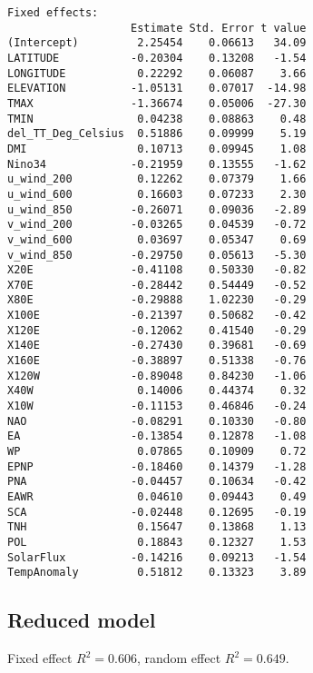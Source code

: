 \documentclass[fleqn,11pt]{article}
\begin{document}
\begin{scriptsize}
\begin{verbatim}
Fixed effects:
                   Estimate Std. Error t value
(Intercept)         2.25454    0.06613   34.09
LATITUDE           -0.20304    0.13208   -1.54
LONGITUDE           0.22292    0.06087    3.66
ELEVATION          -1.05131    0.07017  -14.98
TMAX               -1.36674    0.05006  -27.30
TMIN                0.04238    0.08863    0.48
del_TT_Deg_Celsius  0.51886    0.09999    5.19
DMI                 0.10713    0.09945    1.08
Nino34             -0.21959    0.13555   -1.62
u_wind_200          0.12262    0.07379    1.66
u_wind_600          0.16603    0.07233    2.30
u_wind_850         -0.26071    0.09036   -2.89
v_wind_200         -0.03265    0.04539   -0.72
v_wind_600          0.03697    0.05347    0.69
v_wind_850         -0.29750    0.05613   -5.30
X20E               -0.41108    0.50330   -0.82
X70E               -0.28442    0.54449   -0.52
X80E               -0.29888    1.02230   -0.29
X100E              -0.21397    0.50682   -0.42
X120E              -0.12062    0.41540   -0.29
X140E              -0.27430    0.39681   -0.69
X160E              -0.38897    0.51338   -0.76
X120W              -0.89048    0.84230   -1.06
X40W                0.14006    0.44374    0.32
X10W               -0.11153    0.46846   -0.24
NAO                -0.08291    0.10330   -0.80
EA                 -0.13854    0.12878   -1.08
WP                  0.07865    0.10909    0.72
EPNP               -0.18460    0.14379   -1.28
PNA                -0.04457    0.10634   -0.42
EAWR                0.04610    0.09443    0.49
SCA                -0.02448    0.12695   -0.19
TNH                 0.15647    0.13868    1.13
POL                 0.18843    0.12327    1.53
SolarFlux          -0.14216    0.09213   -1.54
TempAnomaly         0.51812    0.13323    3.89
\end{verbatim}
\end{scriptsize}

\subsection{Reduced model}
Fixed effect $R^2 = 0.606$, random effect $R^2 = 0.649$.
\end{document}
